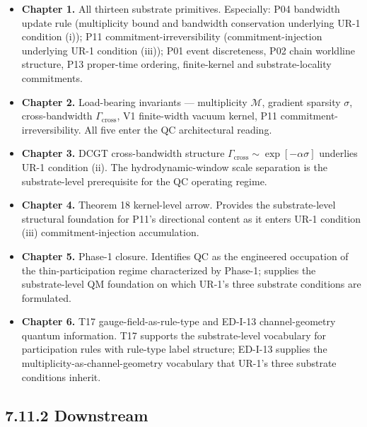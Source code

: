 \documentclass[11pt]{book}
\begin{document}
\begin{itemize}
\item \textbf{Chapter 1.} All thirteen substrate primitives. Especially: P04 bandwidth update rule (multiplicity bound and bandwidth conservation underlying UR-1 condition (i)); P11 commitment-irreversibility (commitment-injection underlying UR-1 condition (iii)); P01 event discreteness, P02 chain worldline structure, P13 proper-time ordering, finite-kernel and substrate-locality commitments.
\item \textbf{Chapter 2.} Load-bearing invariants — multiplicity $\mathcal{M}$, gradient sparsity $\sigma$, cross-bandwidth $\Gamma_\mathrm{cross}$, V1 finite-width vacuum kernel, P11 commitment-irreversibility. All five enter the QC architectural reading.
\item \textbf{Chapter 3.} DCGT cross-bandwidth structure $\Gamma_\mathrm{cross} \sim \exp[-\alpha\sigma]$ underlies UR-1 condition (ii). The hydrodynamic-window scale separation is the substrate-level prerequisite for the QC operating regime.
\item \textbf{Chapter 4.} Theorem 18 kernel-level arrow. Provides the substrate-level structural foundation for P11's directional content as it enters UR-1 condition (iii) commitment-injection accumulation.
\item \textbf{Chapter 5.} Phase-1 closure. Identifies QC as the engineered occupation of the thin-participation regime characterized by Phase-1; supplies the substrate-level QM foundation on which UR-1's three substrate conditions are formulated.
\item \textbf{Chapter 6.} T17 gauge-field-as-rule-type and ED-I-13 channel-geometry quantum information. T17 supports the substrate-level vocabulary for participation rules with rule-type label structure; ED-I-13 supplies the multiplicity-as-channel-geometry vocabulary that UR-1's three substrate conditions inherit.
\end{itemize}

\subsection{7.11.2 Downstream}
\end{document}
